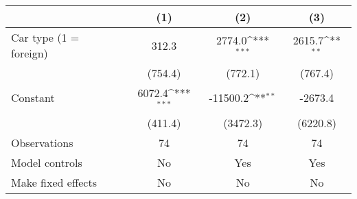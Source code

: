 {
\def\sym#1{\ifmmode^{#1}\else\(^{#1}\)\fi}
\begin{tabular}{l*{3}{c}}
\hline\hline
                &\multicolumn{1}{c}{(1)}         &\multicolumn{1}{c}{(2)}         &\multicolumn{1}{c}{(3)}         \\
\hline
Car type (1 = foreign)&    312.3         &   2774.0\sym{***}&   2615.7\sym{**} \\
                &  (754.4)         &  (772.1)         &  (767.4)         \\
[1em]
Constant        &   6072.4\sym{***}& -11500.2\sym{**} &  -2673.4         \\
                &  (411.4)         & (3472.3)         & (6220.8)         \\
\hline
Observations    &       74         &       74         &       74         \\
Model controls  &       No         &      Yes         &      Yes         \\
Make fixed effects&       No         &       No         &       No         \\
\hline\hline \end{tabular}} \begin{tablenotes} \footnotesize \item \lipsum[1] \end{tablenotes}
